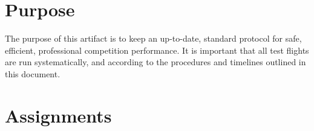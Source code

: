 \documentclass[]{auvsi_doc}
\begin{document}
\begin{AUVSITitlePage}
\begin{artifacttable}
\end{artifacttable}
\end{AUVSITitlePage}

\section{Purpose}

The purpose of this artifact is to keep an up-to-date, standard protocol for safe, efficient, professional competition performance. It is important that all test flights are run systematically, and according to the procedures and timelines outlined in this document.

\section{Assignments}
\end{document}
